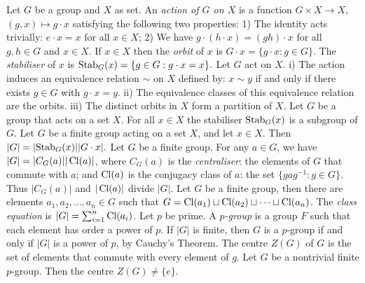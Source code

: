  Let $G$ be a group and $X$ as set. An \textit{action of $G$ on $X$} is a function $G \times X \to X$, $(g,x) \mapsto g \cdot x$ satisfying the following two properties: 1) The identity acts trivially: $e \cdot x = x$ for all $x \in X$; 2) We have $g \cdot (h \cdot x) = (gh) \cdot x$ for all $g,h \in G$ and $x \in X$. If $x \in X$ then the \textit{orbit} of $x$ is $G \cdot x = \{g \cdot x : g \in G\}$. The \textit{stabiliser} of $x$ is $\text{Stab}_{G}(x) = \{ g\in G : g \cdot x = x \}.$
 Let $G$ act on $X$. i) The action induces an equivalence relation $\sim$ on $X$ defined by: $x \sim y$ if and only if there exists $g \in G$ with $g \cdot x = y$. ii) The equivalence classes of this equivalence relation are the orbits. iii) The distinct orbits in $X$ form a partition of $X$.
 Let $G$ be a group that acts on a set $X$. For all $x \in X$ the stabiliser $\text{Stab}_G (x)$ is a subgroup of $G$.
 Let $G$ be a finite group acting on a set $X$, and let $x \in X$. Then $|G| = |\text{Stab}_G (x)||G \cdot x|.$
 Let $G$ be a finite group. For any $a \in G$, we have $|G| = |C_G(a)||\operatorname{Cl}(a)|$, where $C_G(a)$ is the \textit{centraliser}: the elements of $G$ that commute with $a$; and $\operatorname{Cl}(a)$ is the conjugacy class of $a$: the set $\{gag^{-1}: g \in G\}$. Thus $|C_G(a)|$ and $|\operatorname{Cl}(a)|$ divide $|G|$.
 Let $G$ be a finite group, then there are elements $a_1, a_2, \ldots, a_n \in G$ such that 
$G = \operatorname{Cl}(a_1) \sqcup \operatorname{Cl}(a_2) \sqcup \cdots \sqcup \operatorname{Cl}(a_n)$. The \textit{class equation} is $|G| = \sum^n_{i=1} \operatorname{Cl}(a_i)$.
 Let $p$ be prime. A \textit{$p$-group} is a group $F$ such that each element has order a power of $p$. If $|G|$ is finite, then $G$ is a $p$-group if and only if $|G|$ is a power of $p$, by Cauchy's Theorem.
 The centre $Z(G)$ of $G$ is the set of elements that commute with every element of $g$.
 Let $G$ be a nontrivial finite $p$-group. Then the centre $Z(G) \ne \{e\}$.
